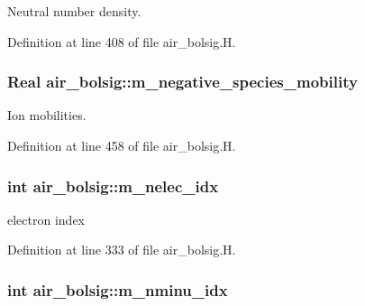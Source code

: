 Neutral number density. 



Definition at line 408 of file air\+\_\+bolsig.\+H.

\subsubsection[{\texorpdfstring{m\+\_\+negative\+\_\+species\+\_\+mobility}{m_negative_species_mobility}}]{\setlength{\rightskip}{0pt plus 5cm}Real air\+\_\+bolsig\+::m\+\_\+negative\+\_\+species\+\_\+mobility\hspace{0.3cm}{\ttfamily [protected]}}\hypertarget{classair__bolsig_a3347b6d67c7584617ebfabb1e6fc4df7}{}\label{classair__bolsig_a3347b6d67c7584617ebfabb1e6fc4df7}


Ion mobilities. 



Definition at line 458 of file air\+\_\+bolsig.\+H.

\subsubsection[{\texorpdfstring{m\+\_\+nelec\+\_\+idx}{m_nelec_idx}}]{\setlength{\rightskip}{0pt plus 5cm}int air\+\_\+bolsig\+::m\+\_\+nelec\+\_\+idx\hspace{0.3cm}{\ttfamily [protected]}}\hypertarget{classair__bolsig_a208346c92fdcdf267fa4762c137de966}{}\label{classair__bolsig_a208346c92fdcdf267fa4762c137de966}


electron index 



Definition at line 333 of file air\+\_\+bolsig.\+H.

\subsubsection[{\texorpdfstring{m\+\_\+nminu\+\_\+idx}{m_nminu_idx}}]{\setlength{\rightskip}{0pt plus 5cm}int air\+\_\+bolsig\+::m\+\_\+nminu\+\_\+idx\hspace{0.3cm}{\ttfamily [protected]}}\hypertarget{classair__bolsig_a10851faf73043289629c436b63ffd096}{}\label{classair__bolsig_a10851faf73043289629c436b63ffd096}


